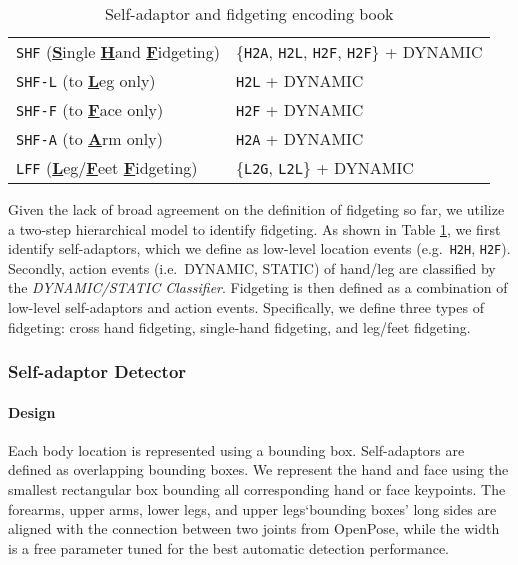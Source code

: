 \begin{table}[]
\begin{tabular}{lp{4.5cm}}
        \midrule
        \texttt{SHF} (\textbf{\underline S}ingle \textbf{\underline H}and \textbf{\underline F}idgeting) & \{\texttt{H2A}, \texttt{H2L}, \texttt{H2F}, \texttt{H2F}\} + DYNAMIC \\
        \texttt{SHF-L} (to \textbf{\underline L}eg only) & \texttt{H2L} + DYNAMIC \\
        \texttt{SHF-F} (to \textbf{\underline F}ace only) & \texttt{H2F} + DYNAMIC \\
        \texttt{SHF-A} (to \textbf{\underline A}rm only) & \texttt{H2A} + DYNAMIC \\
        \midrule
        \texttt{LFF} (\textbf{\underline L}eg/\textbf{\underline F}eet \textbf{\underline F}idgeting) & \{\texttt{L2G}, \texttt{L2L}\} + DYNAMIC\\
        \bottomrule
    \end{tabular}
    \vspace{0.1cm}
    \caption{Self-adaptor and fidgeting encoding book}
    \vspace{-0.6cm}
    \label{tab:event_list}
\end{table}


Given the lack of broad agreement on the definition of fidgeting so far, we utilize a two-step hierarchical model to identify fidgeting.
As shown in Table \ref{tab:event_list}, we first identify self-adaptors, which we define as low-level location events (e.g.\ \texttt{H2H}, \texttt{H2F}). 
Secondly, action events (i.e.\ DYNAMIC, STATIC) of hand/leg are classified by the \textit{DYNAMIC/STATIC Classifier}. Fidgeting is then defined as a combination of low-level self-adaptors and action events.
Specifically, we define three types of fidgeting: cross hand fidgeting, single-hand fidgeting, and leg/feet fidgeting.





\subsubsection{Self-adaptor Detector}

\paragraph{Design}
Each body location is represented using a bounding box. Self-adaptors are defined as overlapping bounding boxes.
We represent the hand and face using the smallest rectangular box bounding all corresponding hand or face keypoints.
The forearms, upper arms, lower legs, and upper legs`bounding boxes' long sides are aligned with the connection between two joints from OpenPose, while the width is a free parameter tuned for the best automatic detection performance.

